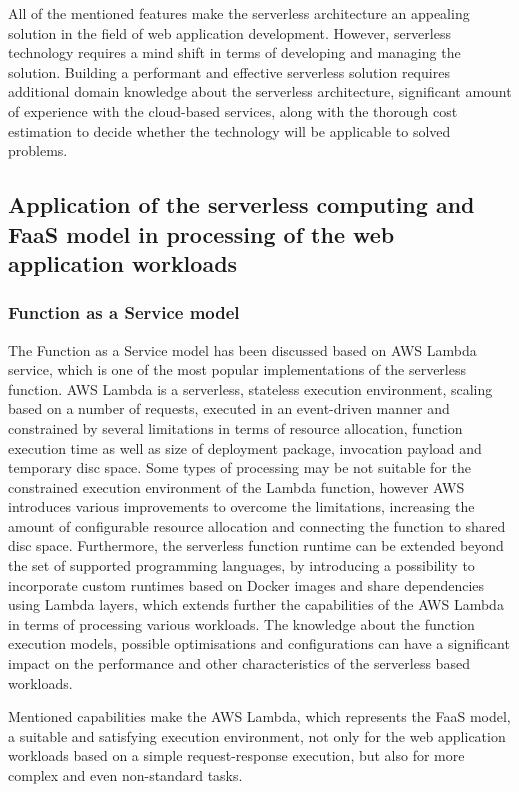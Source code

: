 All of the mentioned features make the serverless architecture an appealing solution in the field of web application development. However, serverless technology requires a mind shift in terms of developing and managing the solution.
Building a performant and effective serverless solution requires additional domain knowledge about the serverless architecture, significant amount of experience with the cloud-based services, along with the thorough cost estimation to decide whether the technology will be applicable to solved problems.

\subsection{Application of the serverless computing and FaaS model in processing of the web application workloads}

\subsubsection{Function as a Service model}

The Function as a Service model has been discussed based on AWS Lambda service, which is one of the most popular implementations of the serverless function. 
AWS Lambda is a serverless, stateless execution environment, scaling based on a number of requests, executed in an event-driven manner and constrained by several limitations in terms of resource allocation, function execution time as well as size of deployment package, invocation payload and temporary disc space.
Some types of processing may be not suitable for the constrained execution environment of the Lambda function, however AWS introduces various improvements to overcome the limitations, increasing the amount of configurable resource allocation and connecting the function to shared disc space.
Furthermore, the serverless function runtime can be extended beyond the set of supported programming languages, by introducing a possibility to incorporate custom runtimes based on Docker images and share dependencies using Lambda layers, which extends further the capabilities of the AWS Lambda in terms of processing various workloads.
The knowledge about the function execution models, possible optimisations and configurations can have a significant impact on the performance and other characteristics of the serverless based workloads.

Mentioned capabilities make the AWS Lambda, which represents the FaaS model, a suitable and satisfying execution environment, not only for the web application workloads based on a simple request-response execution, but also for more complex and even non-standard tasks.


